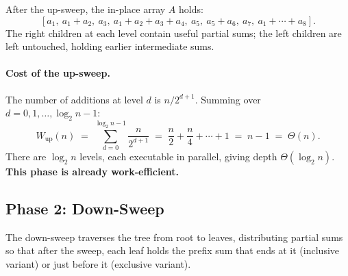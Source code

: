\begin{center}
\end{center}

After the up-sweep, the in-place array $A$ holds:
\[
[a_1,\ a_1{+}a_2,\ a_3,\ a_1{+}a_2{+}a_3{+}a_4,\ a_5,\ a_5{+}a_6,\ a_7,\
 a_1{+}\cdots{+}a_8].
\]
The right children at each level contain useful partial sums; the left
children are left untouched, holding earlier intermediate sums.

\paragraph{Cost of the up-sweep.}
The number of additions at level $d$ is $n / 2^{d+1}$. Summing over
$d = 0, 1, \ldots, \log_2 n - 1$:
\[
W_{\mathrm{up}}(n) \;=\; \sum_{d=0}^{\log_2 n - 1} \frac{n}{2^{d+1}}
\;=\; \frac{n}{2} + \frac{n}{4} + \cdots + 1 \;=\; n - 1 \;=\; \Theta(n).
\]
There are $\log_2 n$ levels, each executable in parallel, giving depth
$\Theta(\log_2 n)$. \textbf{This phase is already work-efficient.}

\subsection{Phase 2: Down-Sweep}
\label{sec:downsweep}

The down-sweep traverses the tree from root to leaves, distributing
partial sums so that after the sweep, each leaf holds the prefix sum
that ends at it (inclusive variant) or just before it (exclusive variant).

